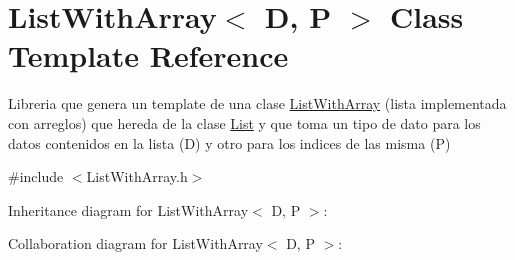 \hypertarget{class_list_with_array}{\section{List\+With\+Array$<$ D, P $>$ Class Template Reference}
\label{class_list_with_array}
}


Libreria que genera un template de una clase \hyperlink{class_list_with_array}{List\+With\+Array} (lista implementada con arreglos) que hereda de la clase \hyperlink{class_list}{List} y que toma un tipo de dato para los datos contenidos en la lista (D) y otro para los indices de las misma (P)  




{\ttfamily \#include $<$List\+With\+Array.\+h$>$}



Inheritance diagram for List\+With\+Array$<$ D, P $>$\+:


Collaboration diagram for List\+With\+Array$<$ D, P $>$\+:
